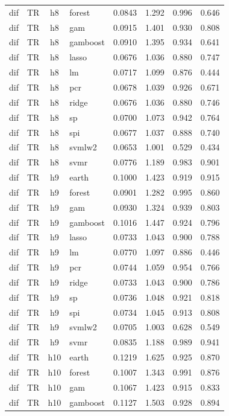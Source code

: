 \begin{ThreePartTable}
\begin{longtable}[t]{llclcccc}
dif & TR & h8 & forest & 0.0843 & 1.292 & 0.996 & 0.646\\
dif & TR & h8 & gam & 0.0915 & 1.401 & 0.930 & 0.808\\
dif & TR & h8 & gamboost & 0.0910 & 1.395 & 0.934 & 0.641\\
dif & TR & h8 & lasso & 0.0676 & 1.036 & 0.880 & 0.747\\
dif & TR & h8 & lm & 0.0717 & 1.099 & 0.876 & 0.444\\
dif & TR & h8 & pcr & 0.0678 & 1.039 & 0.926 & 0.671\\
dif & TR & h8 & ridge & 0.0676 & 1.036 & 0.880 & 0.746\\
dif & TR & h8 & sp & 0.0700 & 1.073 & 0.942 & 0.764\\
dif & TR & h8 & spi & 0.0677 & 1.037 & 0.888 & 0.740\\
dif & TR & h8 & svmlw2 & 0.0653 & 1.001 & 0.529 & 0.434\\
dif & TR & h8 & svmr & 0.0776 & 1.189 & 0.983 & 0.901\\
\addlinespace
dif & TR & h9 & earth & 0.1000 & 1.423 & 0.919 & 0.915\\
dif & TR & h9 & forest & 0.0901 & 1.282 & 0.995 & 0.860\\
dif & TR & h9 & gam & 0.0930 & 1.324 & 0.939 & 0.803\\
dif & TR & h9 & gamboost & 0.1016 & 1.447 & 0.924 & 0.796\\
dif & TR & h9 & lasso & 0.0733 & 1.043 & 0.900 & 0.788\\
dif & TR & h9 & lm & 0.0770 & 1.097 & 0.886 & 0.446\\
dif & TR & h9 & pcr & 0.0744 & 1.059 & 0.954 & 0.766\\
dif & TR & h9 & ridge & 0.0733 & 1.043 & 0.900 & 0.786\\
dif & TR & h9 & sp & 0.0736 & 1.048 & 0.921 & 0.818\\
dif & TR & h9 & spi & 0.0734 & 1.045 & 0.913 & 0.808\\
dif & TR & h9 & svmlw2 & 0.0705 & 1.003 & 0.628 & 0.549\\
dif & TR & h9 & svmr & 0.0835 & 1.188 & 0.989 & 0.941\\
\addlinespace
dif & TR & h10 & earth & 0.1219 & 1.625 & 0.925 & 0.870\\
dif & TR & h10 & forest & 0.1007 & 1.343 & 0.991 & 0.876\\
dif & TR & h10 & gam & 0.1067 & 1.423 & 0.915 & 0.833\\
dif & TR & h10 & gamboost & 0.1127 & 1.503 & 0.928 & 0.894\\

\end{longtable}
\end{ThreePartTable}
